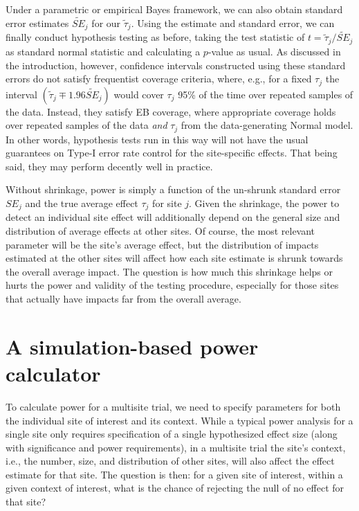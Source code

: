 \documentclass[]{article}
\begin{document}
Under a parametric or empirical Bayes framework, we can also obtain standard error estimates $\tilde{SE}_j$ for our $\tilde{\tau}_j$.
Using the estimate and standard error, we can finally conduct hypothesis testing as before, taking the test statistic of $t = \tilde{\tau}_j / \tilde{SE}_j$ as standard normal statistic and calculating a $p$-value as usual.
As discussed in the introduction, however, confidence intervals constructed using these standard errors do not satisfy frequentist coverage criteria, where, e.g., for a fixed $\tau_j$ the interval $(\tilde{\tau}_j \mp 1.96 \tilde{SE}_j)$ would cover $\tau_j$ 95\% of the time over repeated samples of the data.
Instead, they satisfy EB coverage, where appropriate coverage holds over repeated samples of the data \textit{and} $\tau_j$ from the data-generating Normal model.
In other words, hypothesis tests run in this way will not have the usual guarantees on Type-I error rate control for the site-specific effects.
That being said, they may perform decently well in practice.

Without shrinkage, power is simply a function of the un-shrunk standard error $SE_j$ and the true average effect $\tau_j$ for site $j$.
Given the shrinkage, the power to detect an individual site effect will additionally depend on the general size and distribution of average effects at other sites.
Of course, the most relevant parameter will be the site's average effect, but the distribution of impacts estimated at the other sites will affect how each site estimate is shrunk towards the overall average impact.
The question is how much this shrinkage helps or hurts the power and validity of the testing procedure, especially for those sites that actually have impacts far from the overall average.


\section{A simulation-based power calculator}

To calculate power for a multisite trial, we need to specify parameters for both the individual site of interest and its context.
While a typical power analysis for a single site only requires specification of a single hypothesized effect size (along with significance and power requirements), in a multisite trial the site's context, i.e., the number, size, and distribution of other sites, will also affect the effect estimate for that site.
The question is then: for a given site of interest, within a given context of interest, what is the chance of rejecting the null of no effect for that site?
\end{document}

